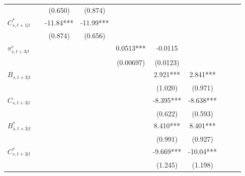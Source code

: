 \begin{table}[htbp]
\begin{tabular}{l*{9}{c}}
                    &               &     (0.650)   &     (0.874)   &               &               &               &               &               &               \\
\addlinespace
$C^*_{s,t+1|t}$     &               &      -11.84***&      -11.99***&               &               &               &               &               &               \\
                    &               &     (0.874)   &     (0.656)   &               &               &               &               &               &               \\
\addlinespace
$\pi^e_{s,t+3|t}$   &               &               &               &      0.0513***&     -0.0115   &               &               &               &               \\
                    &               &               &               &   (0.00697)   &    (0.0123)   &               &               &               &               \\
\addlinespace
$B_{s,t+3|t}$       &               &               &               &               &       2.921***&       2.841***&               &               &               \\
                    &               &               &               &               &     (1.020)   &     (0.971)   &               &               &               \\
\addlinespace
$C_{s,t+3|t}$       &               &               &               &               &      -8.395***&      -8.638***&               &               &               \\
                    &               &               &               &               &     (0.622)   &     (0.593)   &               &               &               \\
\addlinespace
$B^*_{s,t+3|t}$     &               &               &               &               &       8.410***&       8.401***&               &               &               \\
                    &               &               &               &               &     (0.991)   &     (0.927)   &               &               &               \\
\addlinespace
$C^*_{s,t+3|t}$     &               &               &               &               &      -9.669***&      -10.04***&               &               &               \\
                    &               &               &               &               &     (1.245)   &     (1.198)   &               &               &               \\

\end{tabular}
\end{table}

